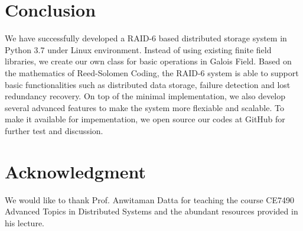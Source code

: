 \documentclass[journal]{IEEEtran}
\begin{document}
\section{Conclusion}
\label{sec6}
We have successfully developed a RAID-6 based distributed storage system in Python 3.7 under Linux environment. Instead of using existing finite field libraries, we create our own class for basic operations in Galois Field. Based on the mathematics of Reed-Solomen Coding, the RAID-6 system is able to support basic functionalities such as distributed data storage, failure detection and lost redundancy recovery. On top of the minimal implementation, we also develop several advanced features to make the system more flexiable and scalable. To make it available for impementation, we open source our codes at GitHub for further test and discussion.


\section*{Acknowledgment}
We would like to thank Prof. Anwitaman Datta for teaching the course CE7490 Advanced Topics in Distributed Systems and the abundant resources provided in his lecture.

\end{document}
